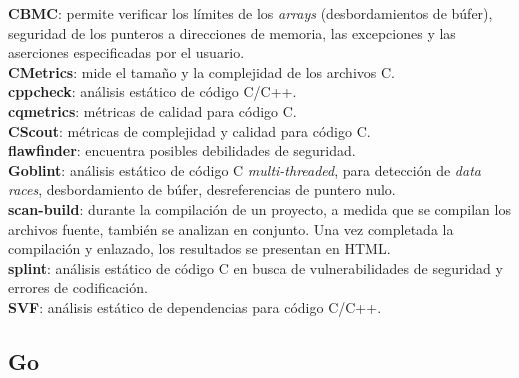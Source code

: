 \textbf{CBMC}: permite verificar los límites de los \textit{arrays} (desbordamientos de búfer), seguridad de los punteros a direcciones de memoria, las excepciones y las aserciones especificadas por el usuario.\\
\textbf{CMetrics}: mide el tamaño y la complejidad de los archivos C.\\
\textbf{cppcheck}: análisis estático de código C/C++.\\
\textbf{cqmetrics}: métricas de calidad para código C.\\
\textbf{CScout}: métricas de complejidad y calidad para código C.\\
\textbf{flawfinder}: encuentra posibles debilidades de seguridad.\\
\textbf{Goblint}: análisis estático de código C \textit{multi-threaded}, para detección de \textit{data races}, desbordamiento de búfer, desreferencias de puntero nulo.\\
\textbf{scan-build}: durante la compilación de un proyecto, a medida que se compilan los archivos fuente, también se analizan en conjunto. Una vez completada la compilación y enlazado, los resultados se presentan en HTML.\\
\textbf{splint}: análisis estático de código C en busca de vulnerabilidades de seguridad y errores de codificación.\\
\textbf{SVF}: análisis estático de dependencias para código C/C++.

\pagebreak

\subsection{Go}

